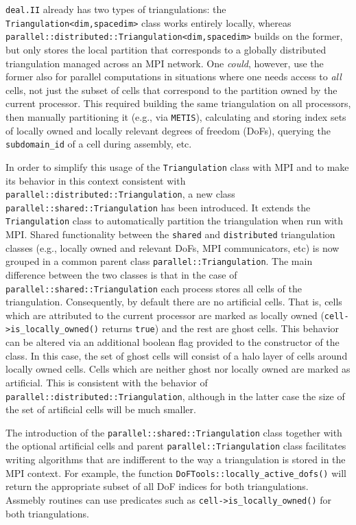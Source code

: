 \documentclass{ansarticle-preprint}
\newcommand{\specialword}[1]{\texttt{#1}}
\newcommand{\dealii}{{\specialword{deal.II}}}
\begin{document}
\dealii{} already has two types of triangulations: the
\texttt{Triangulation<dim,spacedim>} class works entirely locally, whereas
\texttt{parallel::distributed::Triangulation<dim,spacedim>} builds on the
former, but only stores the local partition that corresponds to a globally
distributed triangulation managed across an MPI network. One \textit{could},
however, use the former also for parallel computations in situations where one
needs access to \textit{all} cells, not just the subset of cells that
correspond to the partition owned by the current processor. This required
building the same triangulation on all processors, then
manually partitioning it (e.g., via \texttt{METIS}), calculating and storing
index sets of locally owned and locally relevant degrees of freedom (DoFs),
querying the \texttt{subdomain\_id}  of a cell during assembly, etc.

In order to simplify this usage of the \texttt{Triangulation} class with MPI
and to make its behavior in this context consistent with \texttt{parallel::distributed::Triangulation}, a new class
\texttt{parallel::shared::Triangulation} has been introduced.
It extends the \texttt{Triangulation} class to automatically partition the triangulation when run with MPI.
Shared functionality between the \texttt{shared} and \texttt{distributed}
triangulation classes
(e.g., locally owned and relevant DoFs, MPI communicators, etc)
is now grouped in a common parent class \texttt{parallel::Triangulation}.
The main difference between the two classes is that in the case of
\texttt{parallel::shared::Triangulation} each process stores all cells of the triangulation.
Consequently, by default there are no artificial cells.
That is, cells which are attributed to the current processor are marked as locally owned
(\texttt{cell->is\_locally\_owned()} returns \texttt{true})
and the rest are ghost cells.
This behavior can be altered via an additional boolean flag provided to the constructor of the class.
In this case, the set of ghost cells will consist of a halo layer of cells around locally owned cells.
Cells which are neither ghost nor locally owned are marked as artificial.
This is consistent with the behavior of \texttt{parallel::distributed::Triangulation},
although in the latter case the size of the set of artificial cells will be
much smaller.

The introduction of the \texttt{parallel::shared::Triangulation} class together with the
optional artificial cells and parent \texttt{parallel::Triangulation} class
facilitates writing
algorithms that are indifferent to the way a triangulation is stored in the MPI context.
For example, the function \texttt{DoFTools::locally\_active\_dofs()} will
return the appropriate subset of
all DoF indices for both triangulations.
Assmebly routines can use predicates such as \texttt{cell->is\_locally\_owned()}
for both triangulations.
\end{document}
